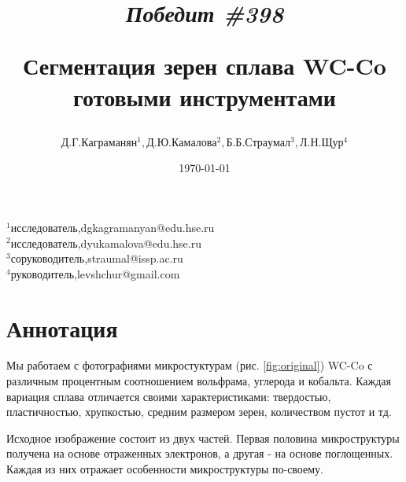\documentclass[a4paper, 14pt]{article}
\begin{document}
	\title{		\textbf{\textit{Победит \#398}} 
		
		Сегментация зерен сплава WC-Co готовыми инструментами}

	\author{$ Д.Г. Каграманян^1, Д.Ю. Камалова^2, Б.Б. Страумал^3, Л.Н. Щур^4$}
	\date{\today}
	\maketitle
	
	\hfill
	\begin{minipage}{1\textwidth}
		\flushleft
		$^1$исследователь,dgkagramanyan@edu.hse.ru\\
		$^2$исследователь,dyukamalova@edu.hse.ru \\
		$^3$соруководитель,straumal@issp.ac.ru\\
		$^4$руководитель,levshchur@gmail.com\\
		
		
		
	\end{minipage}%




	
	\section{Аннотация}

	Мы работаем с фотографиями микростуктурам (рис. \ref{fig:original}) WC-Co с различным процентным соотношением вольфрама, углерода и кобальта. 
	Каждая вариация сплава отличается своими характеристиками: твердостью, пластичностью, 
	хрупкостью, средним размером зерен, количеством пустот и тд.

	Исходное изображение состоит из двух частей. Первая половина микроструктуры получена на основе отраженных электронов, а другая - на основе поглощенных. Каждая из них отражает особенности микроструктуры по-своему. 
\end{document}
